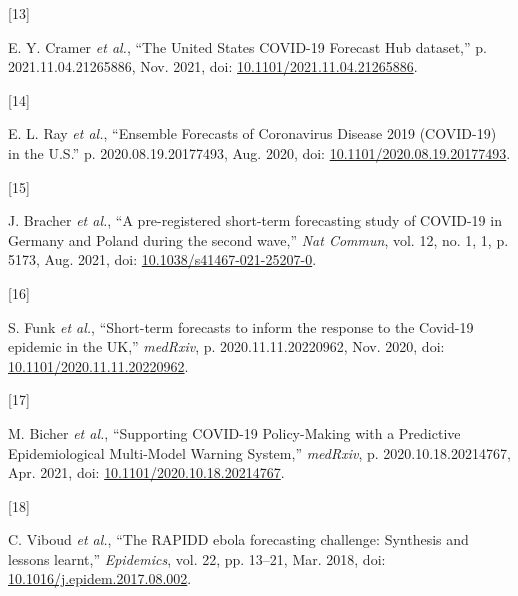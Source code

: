 \documentclass[
]{article}
\newlength{\cslhangindent}
\newlength{\csllabelwidth}
\newlength{\cslentryspacingunit} %
\newenvironment{CSLReferences}[2] %
 {%
  \setlength{\parindent}{0pt}
  \ifodd #1
  \let\oldpar\par
  \def\par{\hangindent=\cslhangindent\oldpar}
  \fi
  \setlength{\parskip}{#2\cslentryspacingunit}
 }%
 {}
\newcommand{\CSLLeftMargin}[1]{\parbox[t]{\csllabelwidth}{#1}}
\newcommand{\CSLRightInline}[1]{\parbox[t]{\linewidth - \csllabelwidth}{#1}\break}
\providecommand{\DIFaddbegin}{} %
\providecommand{\DIFaddend}{} %
\providecommand{\DIFdelbegin}{} %
\providecommand{\DIFdelend}{} %
\newcommand{\DIFscaledelfig}{0.5}
\newlength{\DIFdelgraphicswidth} %
\newlength{\DIFdelgraphicsheight} %
\newcommand{\DIFaddincludegraphics}[2][]{{\color{blue}\fbox{\DIFOincludegraphics[#1]{#2}}}} %
\newcommand{\DIFdelincludegraphics}[2][]{%
\sbox{\DIFdelgraphicsbox}{\DIFOincludegraphics[#1]{#2}}%
\settoboxwidth{\DIFdelgraphicswidth}{\DIFdelgraphicsbox} %
\settoboxtotalheight{\DIFdelgraphicsheight}{\DIFdelgraphicsbox} %
\scalebox{\DIFscaledelfig}{%
\parbox[b]{\DIFdelgraphicswidth}{\usebox{\DIFdelgraphicsbox}\\[-\baselineskip] \rule{\DIFdelgraphicswidth}{0em}}\llap{\resizebox{\DIFdelgraphicswidth}{\DIFdelgraphicsheight}{%
\setlength{\unitlength}{\DIFdelgraphicswidth}%
\begin{picture}(1,1)%
\thicklines\linethickness{2pt} %
{\color[rgb]{1,0,0}\put(0,0){\framebox(1,1){}}}%
{\color[rgb]{1,0,0}\put(0,0){\line( 1,1){1}}}%
{\color[rgb]{1,0,0}\put(0,1){\line(1,-1){1}}}%
\end{picture}%
}\hspace*{3pt}}} %
} %
\DeclareRobustCommand{\DIFaddbegin}{\DIFOaddbegin \let\includegraphics\DIFaddincludegraphics} %
\DeclareRobustCommand{\DIFaddend}{\DIFOaddend \let\includegraphics\DIFOincludegraphics} %
\DeclareRobustCommand{\DIFdelbegin}{\DIFOdelbegin \let\includegraphics\DIFdelincludegraphics} %
\DeclareRobustCommand{\DIFdelend}{\DIFOaddend \let\includegraphics\DIFOincludegraphics} %
\begin{document}
\begin{CSLReferences}{0}{0}
\leavevmode{}%
\DIFdelbegin %
\DIFdelend \DIFaddbegin \CSLLeftMargin{{[}13{]} }
\DIFaddend \CSLRightInline{E. Y. Cramer \emph{et al.}, {``The {United States COVID-19 Forecast Hub} dataset,''} p. 2021.11.04.21265886, Nov. 2021, doi: \href{https://doi.org/10.1101/2021.11.04.21265886}{10.1101/2021.11.04.21265886}.}

\leavevmode{}%
\DIFdelbegin %
\DIFdelend \DIFaddbegin \CSLLeftMargin{{[}14{]} }
\DIFaddend \CSLRightInline{E. L. Ray \emph{et al.}, {``Ensemble {Forecasts} of {Coronavirus Disease} 2019 ({COVID-19}) in the {U}.{S}.''} p. 2020.08.19.20177493, Aug. 2020, doi: \href{https://doi.org/10.1101/2020.08.19.20177493}{10.1101/2020.08.19.20177493}.}

\leavevmode{}%
\DIFdelbegin %
\DIFdelend \DIFaddbegin \CSLLeftMargin{{[}15{]} }
\DIFaddend \CSLRightInline{J. Bracher \emph{et al.}, {``A pre-registered short-term forecasting study of {COVID-19} in {Germany} and {Poland} during the second wave,''} \emph{Nat Commun}, vol. 12, no. 1, 1, p. 5173, Aug. 2021, doi: \href{https://doi.org/10.1038/s41467-021-25207-0}{10.1038/s41467-021-25207-0}.}

\leavevmode{}%
\DIFdelbegin %
\DIFdelend \DIFaddbegin \CSLLeftMargin{{[}16{]} }
\DIFaddend \CSLRightInline{S. Funk \emph{et al.}, {``Short-term forecasts to inform the response to the {Covid-19} epidemic in the {UK},''} \emph{medRxiv}, p. 2020.11.11.20220962, Nov. 2020, doi: \href{https://doi.org/10.1101/2020.11.11.20220962}{10.1101/2020.11.11.20220962}.}

\leavevmode{}%
\DIFdelbegin %
\DIFdelend \DIFaddbegin \CSLLeftMargin{{[}17{]} }
\DIFaddend \CSLRightInline{M. Bicher \emph{et al.}, {``Supporting {COVID-19 Policy-Making} with a {Predictive Epidemiological Multi-Model Warning System},''} \emph{medRxiv}, p. 2020.10.18.20214767, Apr. 2021, doi: \href{https://doi.org/10.1101/2020.10.18.20214767}{10.1101/2020.10.18.20214767}.}

\leavevmode{}%
\DIFdelbegin %
\DIFdelend \DIFaddbegin \CSLLeftMargin{{[}18{]} }
\DIFaddend \CSLRightInline{C. Viboud \emph{et al.}, {``The {RAPIDD} ebola forecasting challenge: {Synthesis} and lessons learnt,''} \emph{Epidemics}, vol. 22, pp. 13--21, Mar. 2018, doi: \href{https://doi.org/10.1016/j.epidem.2017.08.002}{10.1016/j.epidem.2017.08.002}.}


\end{CSLReferences}
\end{document}
